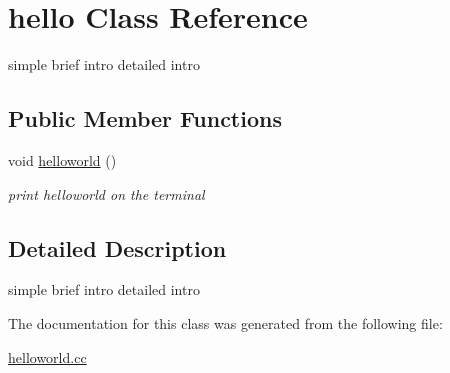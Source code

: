\hypertarget{classhello}{}\section{hello Class Reference}
\label{classhello}


simple brief intro  detailed intro  


\subsection*{Public Member Functions}
\begin{DoxyCompactItemize}
\item 
\mbox{\label{classhello_a7fabfcda038de9dd88bff7f4c3bf704d}} 
void \hyperlink{classhello_a7fabfcda038de9dd88bff7f4c3bf704d}{helloworld} ()
\begin{DoxyCompactList}\small\item\em print helloworld on the terminal \end{DoxyCompactList}\end{DoxyCompactItemize}


\subsection{Detailed Description}
simple brief intro  detailed intro 

The documentation for this class was generated from the following file\+:\begin{DoxyCompactItemize}
\item 
\hyperlink{helloworld_8cc}{helloworld.\+cc}\end{DoxyCompactItemize}
